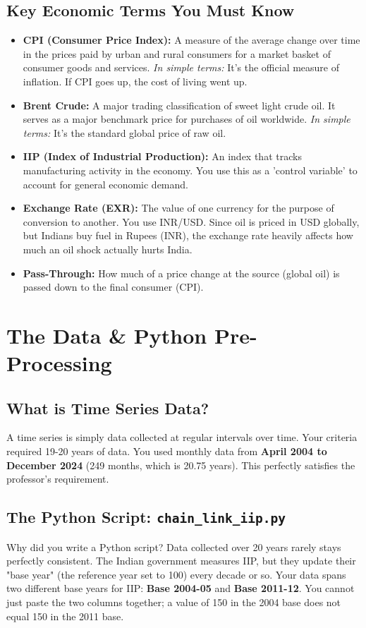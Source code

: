 \documentclass[12pt,a4paper]{report}
\begin{document}
\section{Key Economic Terms You Must Know}
\begin{itemize}
    \item \textbf{CPI (Consumer Price Index):} A measure of the average change over time in the prices paid by urban and rural consumers for a market basket of consumer goods and services. \textit{In simple terms:} It's the official measure of inflation. If CPI goes up, the cost of living went up.
    \item \textbf{Brent Crude:} A major trading classification of sweet light crude oil. It serves as a major benchmark price for purchases of oil worldwide. \textit{In simple terms:} It's the standard global price of raw oil. 
    \item \textbf{IIP (Index of Industrial Production):} An index that tracks manufacturing activity in the economy. You use this as a 'control variable' to account for general economic demand.
    \item \textbf{Exchange Rate (EXR):} The value of one currency for the purpose of conversion to another. You use INR/USD. Since oil is priced in USD globally, but Indians buy fuel in Rupees (INR), the exchange rate heavily affects how much an oil shock actually hurts India.
    \item \textbf{Pass-Through:} How much of a price change at the source (global oil) is passed down to the final consumer (CPI). 
\end{itemize}

\newpage
\chapter{The Data \& Python Pre-Processing}
\section{What is Time Series Data?}
A time series is simply data collected at regular intervals over time. Your criteria required 19-20 years of data. You used monthly data from \textbf{April 2004 to December 2024} (249 months, which is 20.75 years). This perfectly satisfies the professor's requirement.

\section{The Python Script: \texttt{chain\_link\_iip.py}}
Why did you write a Python script? Data collected over 20 years rarely stays perfectly consistent. The Indian government measures IIP, but they update their "base year" (the reference year set to 100) every decade or so. 
Your data spans two different base years for IIP: \textbf{Base 2004-05} and \textbf{Base 2011-12}. You cannot just paste the two columns together; a value of 150 in the 2004 base does not equal 150 in the 2011 base.
\end{document}
